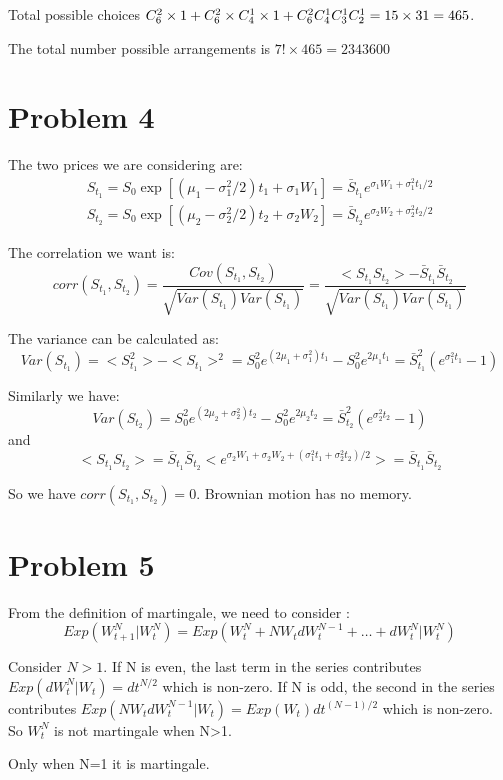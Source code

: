 \documentclass[12pt]{amsart}
\begin{document}
Total possible choices $C_6^2\times 1 \time 3 + C_6^2\times C_4^1 \times 1 + C_6^2 C_4^1 C_3^1 C_2^1  = 15\times 31 =465$.

The total number possible arrangements is $7!\times 465 = 2343600$

\section{Problem 4}
The two prices we are considering are:
\begin{eqnarray*}
	S_{t_1} =S_0 \exp[(\mu_1-\sigma_1^2/2)t_1 +\sigma_1 W_1] = \bar{S}_{t_1}e^{\sigma_1 W_1+\sigma_1^2 t_1/2 } \\
	S_{t_2} =S_0 \exp[(\mu_2-\sigma_2^2/2)t_2 +\sigma_2 W_2] = \bar{S}_{t_2}e^{\sigma_2 W_2+\sigma_2^2 t_2/2 }
\end{eqnarray*}

The correlation we want is:
\[
corr(S_{t_1}, S_{t_2}) = \frac{Cov(S_{t_1}, S_{t_2})}{\sqrt{Var(S_{t_1}) Var(S_{t_1})}} = \frac{<S_{t_1}S_{t_2}> - \bar{S}_{t_1} \bar{S}_{t_2}}{\sqrt{Var(S_{t_1}) Var(S_{t_1})}}
\]

The variance can be calculated as:
\[
Var(S_{t_1}) = <S_{t_1}^2>  - <S_{t_1}>^2 = S_0^2 e^{(2\mu_1+\sigma_1^2)t_1} - S_0^2 e^{2\mu_1 t_1} = \bar{S}_{t_1}^2(e^{\sigma_1^2 t_1}-1)
\]

Similarly we have:
\[
Var(S_{t_2}) =S_0^2 e^{(2\mu_2+\sigma_2^2)t_2} - S_0^2 e^{2\mu_2 t_2} = \bar{S}_{t_2}^2(e^{\sigma_2^2 t_2}-1) 
\]
and 
\[
<S_{t_1}S_{t_2}> = \bar{S}_{t_1}\bar{S}_{t_2}<e^{\sigma_2 W_1+\sigma_2 W_2 +(\sigma_1^2 t_1 + \sigma_2^2 t_2)/2}> = \bar{S}_{t_1}\bar{S}_{t_2}
\]

So we have $corr(S_{t_1}, S_{t_2})=0$. Brownian motion has no memory.

\section{Problem 5}

From the definition of martingale, we need to consider :
\[
Exp(W_{t+1}^N|W_t^N) = Exp(W_t^N + N W_t dW_t^{N-1} +\dots + dW_t^N|W_t^N)
\]

Consider $N>1$. If N is even, the last term in the series contributes $Exp(dW_t^N|W_t) = dt^{N/2}$ which is non-zero. If N is odd, the second in the series contributes $Exp(N W_t dW_t^{N-1}|W_t) = Exp(W_t) dt^{(N-1)/2}$ which is non-zero. So $W_t^N$ is not martingale when N>1.

Only when N=1 it is martingale.
\end{document}
